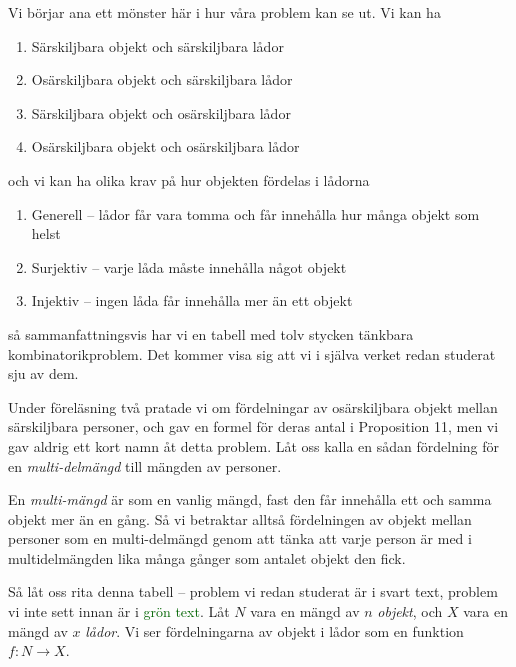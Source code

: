 \documentclass[nobib]{tufte-handout}
\begin{document}
Vi börjar ana ett mönster här i hur våra problem kan se ut. Vi kan ha
\begin{enumerate}
  \item Särskiljbara objekt och särskiljbara lådor
  \item Osärskiljbara objekt och särskiljbara lådor
  \item Särskiljbara objekt och osärskiljbara lådor
  \item Osärskiljbara objekt och osärskiljbara lådor
\end{enumerate}
och vi kan ha olika krav på hur objekten fördelas i lådorna
\begin{enumerate}
  \item Generell -- lådor får vara tomma och får innehålla hur många objekt som helst
  \item Surjektiv -- varje låda måste innehålla något objekt
  \item Injektiv -- ingen låda får innehålla mer än ett objekt
\end{enumerate}
så sammanfattningsvis har vi en tabell med tolv stycken tänkbara kombinatorikproblem. Det kommer visa sig att vi i själva verket redan studerat sju av dem.


Under föreläsning två pratade vi om fördelningar av osärskiljbara objekt mellan särskiljbara personer, och gav en formel för deras antal i Proposition 11, men vi gav aldrig ett kort namn åt detta problem. Låt oss kalla en sådan fördelning för en \emph{multi-delmängd} till mängden av personer.

En \emph{multi-mängd} är som en vanlig mängd, fast den får innehålla ett och samma objekt mer än en gång. Så vi betraktar alltså fördelningen av objekt mellan personer som en multi-delmängd genom att tänka att varje person är med i multidelmängden lika många gånger som antalet objekt den fick.

Så låt oss rita denna tabell -- problem vi redan studerat är i svart text, problem vi inte sett innan är i \textcolor{darkgreen}{grön text}. Låt $N$ vara en mängd av $n$ \emph{objekt}, och $X$ vara en mängd av $x$ \emph{lådor}. Vi ser fördelningarna av objekt i lådor som en funktion $f: N \to X$.
\end{document}
